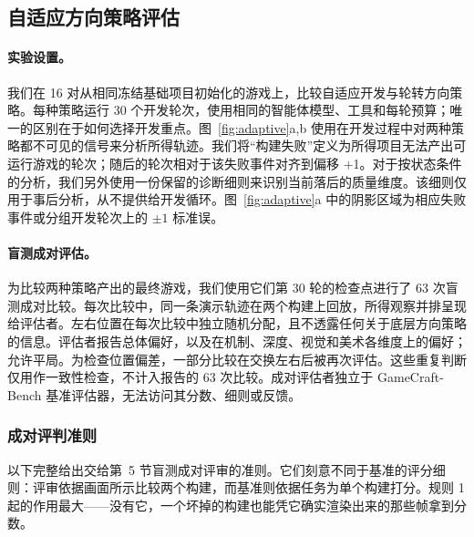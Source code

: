 \subsection{自适应方向策略评估}\label{app:adaptive}
\paragraph{实验设置。}我们在 16 对从相同冻结基础项目初始化的游戏上，比较自适应开发与轮转方向策略。每种策略运行 30 个开发轮次，使用相同的智能体模型、工具和每轮预算；唯一的区别在于如何选择开发重点。图~\ref{fig:adaptive}a,b 使用在开发过程中对两种策略都不可见的信号来分析所得轨迹。我们将“构建失败”定义为所得项目无法产出可运行游戏的轮次；随后的轮次相对于该失败事件对齐到偏移 +1。对于按状态条件的分析，我们另外使用一份保留的诊断细则来识别当前落后的质量维度。该细则仅用于事后分析，从不提供给开发循环。图~\ref{fig:adaptive}a 中的阴影区域为相应失败事件或分组开发轮次上的 $\pm1$ 标准误。

\paragraph{盲测成对评估。}为比较两种策略产出的最终游戏，我们使用它们第 30 轮的检查点进行了 63 次盲测成对比较。每次比较中，同一条演示轨迹在两个构建上回放，所得观察并排呈现给评估者。左右位置在每次比较中独立随机分配，且不透露任何关于底层方向策略的信息。评估者报告总体偏好，以及在机制、深度、视觉和美术各维度上的偏好；允许平局。为检查位置偏差，一部分比较在交换左右后被再次评估。这些重复判断仅用作一致性检查，不计入报告的 63 次比较。成对评估者独立于 GameCraft-Bench 基准评估器，无法访问其分数、细则或反馈。

\subsubsection{成对评判准则}
以下完整给出交给第~5 节盲测成对评审的准则。它们刻意不同于基准的评分细则：评审依据画面所示比较两个构建，而基准则依据任务为单个构建打分。规则 1 起的作用最大——没有它，一个坏掉的构建也能凭它确实渲染出来的那些帧拿到分数。

